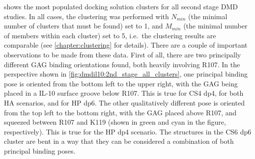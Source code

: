  shows the most populated docking
solution clusters for all second stage DMD studies. In all cases, the clustering
was performed with $N_{min}$ (the minimal number of clusters that must be found)
set to 1, and $M_{min}$ (the minimal number of members within each cluster) set
to 5, i.e.\ the clustering results are comparable (see \cref{chapter:clustering}
for details). There are a couple of important observations to be made from these
data. First of all, there are two principally different GAG binding orientations
found, both heavily involving R107. In the perspective shown in
\cref{fig:dmdil10:2nd_stage_all_clusters}, one principal binding pose is
oriented from the bottom left to the upper right, with the GAG being placed in a
IL-10 surface groove below R107. This is true for CS4 dp4, for both HA
scenarios, and for HP dp6. The other qualitatively different pose is oriented
from the top left to the bottom right, with the GAG placed above R107, and
squeezed between R107 and K119 (shown in green and cyan in the figure,
respectively). This is true for the HP dp4 scenario. The structures in the CS6
dp6 cluster are bent in a way that they can be considered a combination of both
principal binding poses.

